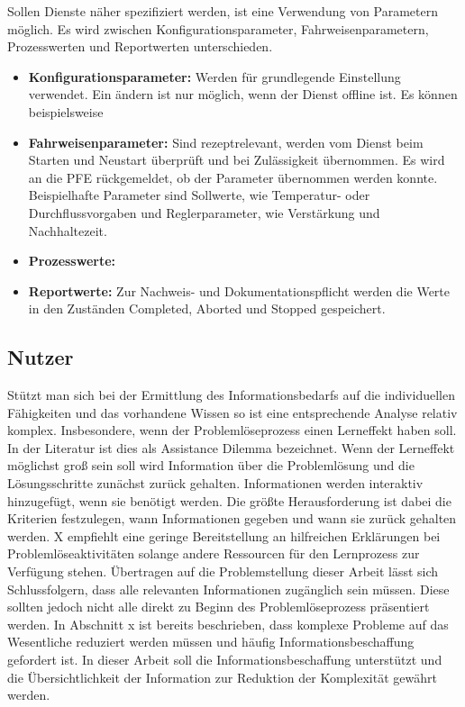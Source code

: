 Sollen Dienste näher spezifiziert werden, ist eine Verwendung von Parametern möglich. Es wird zwischen Konfigurationsparameter, Fahrweisenparametern, Prozesswerten und Reportwerten unterschieden.
\begin{itemize}
\item \textbf{Konfigurationsparameter:} Werden für grundlegende Einstellung verwendet. Ein ändern ist nur möglich, wenn der Dienst offline ist. Es können beispielsweise 
\item \textbf{Fahrweisenparameter:} Sind rezeptrelevant, werden vom Dienst beim Starten und Neustart überprüft und bei Zulässigkeit übernommen. Es wird an die PFE rückgemeldet, ob der Parameter übernommen werden konnte. Beispielhafte Parameter sind Sollwerte, wie Temperatur- oder Durchflussvorgaben und Reglerparameter, wie Verstärkung und Nachhaltezeit.
\item \textbf{Prozesswerte:} 
\item \textbf{Reportwerte:} Zur Nachweis- und Dokumentationspflicht werden die Werte in den Zuständen Completed, Aborted und Stopped gespeichert.
\end{itemize}

\subsection{Nutzer}
Stützt man sich bei der Ermittlung des Informationsbedarfs auf die individuellen Fähigkeiten und das vorhandene Wissen so ist eine entsprechende Analyse relativ komplex. Insbesondere, wenn der Problemlöseprozess einen Lerneffekt haben soll. In der Literatur ist dies als Assistance Dilemma bezeichnet. Wenn der Lerneffekt möglichst groß sein soll wird Information über die Problemlösung und die Lösungsschritte zunächst zurück gehalten. Informationen werden interaktiv hinzugefügt, wenn sie benötigt werden. Die größte Herausforderung ist dabei die Kriterien festzulegen, wann Informationen gegeben und wann sie zurück gehalten werden. \cite{}  X empfiehlt eine geringe Bereitstellung an hilfreichen Erklärungen bei Problemlöseaktivitäten solange andere Ressourcen für den Lernprozess zur Verfügung stehen. Übertragen auf die Problemstellung dieser Arbeit lässt sich Schlussfolgern, dass alle relevanten Informationen zugänglich sein müssen. Diese sollten jedoch nicht alle direkt zu Beginn des Problemlöseprozess präsentiert werden. In Abschnitt x ist bereits beschrieben, dass komplexe Probleme auf das Wesentliche reduziert werden müssen und häufig Informationsbeschaffung gefordert ist. In dieser Arbeit soll die Informationsbeschaffung unterstützt und die Übersichtlichkeit der Information zur Reduktion der Komplexität gewährt werden.


